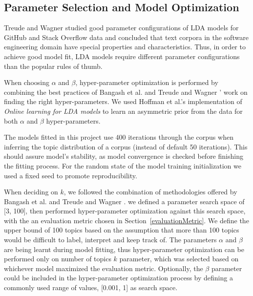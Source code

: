     \subsection{Parameter Selection and Model Optimization}
    
        Treude and Wagner \cite{treude2019predicting} studied good parameter configurations of LDA models for GitHub and Stack Overflow data and concluded that text corpora in the software engineering domain have special properties and characteristics. Thus,  in order to achieve good model fit, LDA models require different parameter configurations than the popular rules of thumb.
        
        When choosing $\alpha$ and $\beta$, hyper-parameter optimization is performed by combining the best practices of Bangash et al. \cite{bangash2019developers} and Treude and Wagner \cite{treude2019predicting}' work on finding the right hyper-parameters. We used Hoffman et al.'s implementation of \textit{Online learning for LDA models} \cite{hoffman2010online} to learn an asymmetric prior from the data for both $\alpha$ and $\beta$ hyper-parameters.
        
        The models fitted in this project use 400 iterations through the corpus when inferring the topic distribution of a corpus (instead of default 50 iterations). This should assure model's stability, as model convergence is checked before finishing the fitting process. For the random state of the model training initialization we used a fixed seed to promote reproducibility.
        
        When deciding on $k$, we followed the combination of methodologies offered by Bangash et al. \cite{bangash2019developers} and Treude and Wagner \cite{treude2019predicting}. we defined a parameter search space of [3, 100], then performed hyper-parameter optimization against this search space, with the an evaluation metric chosen in Section~\ref{evaluationMetric}. We define the upper bound of 100 topics based on the assumption that more than 100 topics would be difficult to label, interpret and keep track of. The parameters $\alpha$ and $\beta$ are being learnt during model fitting, thus  hyper-parameter optimization can be performed only on number of topics $k$ parameter, which was selected based on whichever model maximized the evaluation metric. Optionally, the $\beta$ parameter could be included in the hyper-parameter optimization process by defining a commonly used range of values, [0.001, 1] as search space.
    
